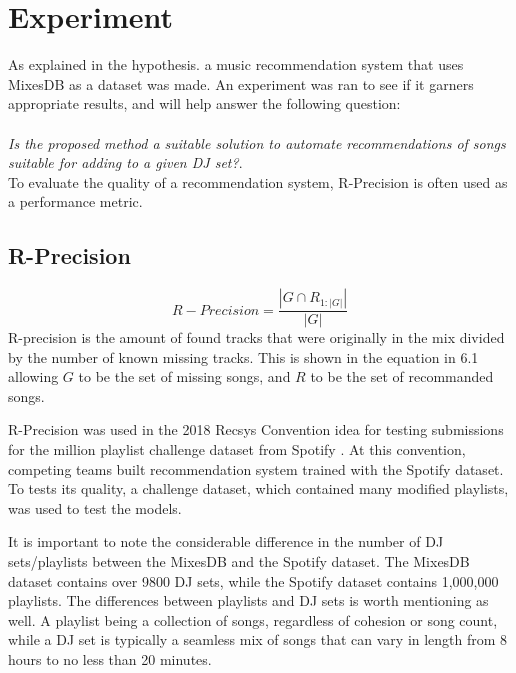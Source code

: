 
\graphicspath{{Chapter5/}}


\chapter{Experiment}


As explained in the hypothesis. a music recommendation system that uses MixesDB as a dataset was made. An experiment was ran to see if it garners appropriate results, and will help answer the following question:
\\
\\
\textit{Is the proposed method a suitable solution to automate recommendations of songs suitable for adding to a given DJ set?}.
\\

To evaluate the quality of a recommendation system, R-Precision is often used as a performance metric. 

\section{R-Precision}

\begin{equation}
	R-Precision = \frac{|G\cap R_{1:|G|}|}{|G|}
\end{equation}
R-precision is the amount of found tracks that were originally in the mix divided by the number of known missing tracks. This is shown in the equation in 6.1 allowing $G$ to be the set of missing songs, and $R$ to be the set of recommanded songs.

R-Precision was used in the 2018 Recsys Convention idea for testing submissions for the million playlist challenge dataset from Spotify \citep{aicrowd_aicrowd_2023}. At this convention, competing teams built recommendation system trained with the Spotify dataset. To tests its quality, a challenge dataset, which contained many modified playlists, was used to test the models.

It is important to note the considerable difference in the number of DJ sets/playlists between the MixesDB and the Spotify dataset. The MixesDB dataset contains over 9800 DJ sets, while the Spotify dataset contains 1,000,000 playlists. The differences between playlists and DJ sets is worth mentioning as well. A playlist being a collection of songs, regardless of cohesion or song count, while a DJ set is typically a seamless mix of songs that can vary in length from 8 hours to no less than 20 minutes.

